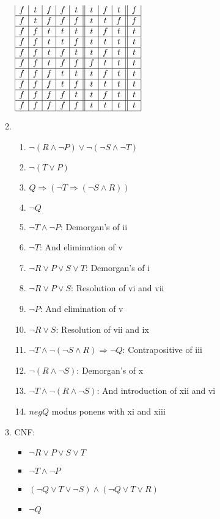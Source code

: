 \documentclass[10pt]{article}
\begin{document}
\begin{enumerate}
\begin{enumerate}
\begin{math}
\begin{array}{|c|c|c|c|c||c|c|c||c|}
      f & t & f & f & t & t & f & t & f \\ \hline
      f & t & f & f & f & t & t & f & f \\ \hline
      f & f & t & t & t & t & f & t & t \\ \hline
      f & f & t & t & f & t & t & t & t \\ \hline %
      f & f & t & f & t & t & f & t & t \\ \hline
      f & f & t & f & f & f & t & t & t \\ \hline
      f & f & f & t & t & t & f & t & t \\ \hline
      f & f & f & t & f & t & t & t & t \\ \hline %
      f & f & f & f & t & t & f & t & t \\ \hline
      f & f & f & f & f & t & t & t & t \\ \hline %
    \end{array}
    \end{math}
  \item %
    \begin{enumerate}
    \item $\neg (R \land \neg P) \lor \neg (\neg S \land \neg T)$
    \item $\neg (T \lor P)$
    \item $Q \Rightarrow (\neg T \Rightarrow (\neg S \land R))$
    \item $\neg Q$
    \item $\neg T \land \neg P$: Demorgan's of ii
    \item $\neg T$: And elimination of v
    \item $\neg R \lor P \lor S \lor T$: Demorgan's of i
    \item $\neg R \lor P \lor S$: Resolution of vi and vii
    \item $\neg P$: And elimination of v
    \item $\neg R \lor S$: Resolution of vii and ix
    \item $\neg T \land \neg (\neg S \land R) \Rightarrow \neg Q$: Contrapositive of iii
    \item $\neg (R \land \neg S)$: Demorgan's of x
    \item $\neg T \land \neg (R \land \neg S)$: And introduction of xii and vi
    \item $neg Q$ modus ponens with xi and xiii 
    \end{enumerate}
  \item %
    CNF: \\
    \begin{itemize}
    \item $\neg R \lor P \lor S \lor T$
    \item $\neg T \land \neg P$
    \item $(\neg Q \lor T \lor \neg S) \land (\neg Q \lor T \lor R)$
    \item $\neg Q$
    \end{itemize}
    

\end{enumerate}
\end{enumerate}
\end{document}

